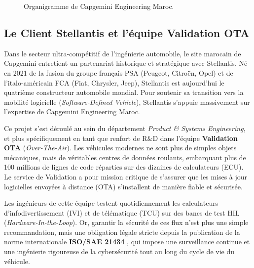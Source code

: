 \documentclass[a4paper, 12pt]{report}
\begin{document}
\begin{figure}[H]
{
    }
    \caption[Organigramme de Capgemini Engineering Maroc]{Organigramme de Capgemini Engineering Maroc.}
    \label{fig:organigramme_capgemini}
\end{figure}


\subsection{Le Client Stellantis et l'équipe Validation OTA}
Dans le secteur ultra-compétitif de l'ingénierie automobile, le site marocain de Capgemini entretient un partenariat historique et stratégique avec Stellantis. Né en 2021 de la fusion du groupe français PSA (Peugeot, Citroën, Opel) et de l'italo-américain FCA (Fiat, Chrysler, Jeep), Stellantis est aujourd'hui le quatrième constructeur automobile mondial. Pour soutenir sa transition vers la mobilité logicielle (\textit{Software-Defined Vehicle}), Stellantis s'appuie massivement sur l'expertise de Capgemini Engineering Maroc.

Ce projet s'est déroulé au sein du département \textit{Product \& Systems Engineering}, et plus spécifiquement en tant que renfort de R\&D dans l'équipe \textbf{Validation OTA} (\textit{Over-The-Air}). Les véhicules modernes ne sont plus de simples objets mécaniques, mais de véritables centres de données roulants, embarquant plus de 100 millions de lignes de code réparties sur des dizaines de calculateurs (ECU). Le service de Validation a pour mission critique de s'assurer que les mises à jour logicielles envoyées à distance (OTA) s'installent de manière fiable et sécurisée. 

Les ingénieurs de cette équipe testent quotidiennement les calculateurs d'infodivertissement (IVI) et de télématique (TCU) sur des bancs de test HIL (\textit{Hardware-In-the-Loop}). Or, garantir la sécurité de ces flux n'est plus une simple recommandation, mais une obligation légale stricte depuis la publication de la norme internationale \textbf{ISO/SAE 21434} \cite{iso_21434}, qui impose une surveillance continue et une ingénierie rigoureuse de la cybersécurité tout au long du cycle de vie du véhicule.
\end{document}
